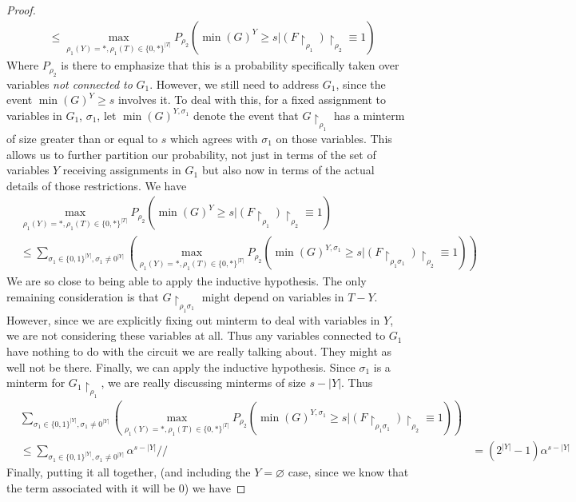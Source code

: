 \documentclass{article}
\theoremstyle{definition}
\theoremstyle{plain}
\theoremstyle{theorem}
\begin{document}
\begin{proof}
\begin{align*}
	 &\leq \max_{\rho_1(Y) = *, \rho_1(T) \in \{0,*\}^{|T|}} P_{\rho_2}(\min(G)^Y \geq s| (F \restriction_{\rho_1}) \restriction_{\rho_2} \equiv 1) 
\end{align*} 
Where $P_{\rho_2}$ is there to emphasize that this is a probability specifically taken over variables \emph{not connected to } $G_1$. However, we still need to address $G_1$, since the event $\min(G)^Y \geq s$ involves it. To deal with this, for a fixed assignment to variables in $G_1$, $\sigma_1$, let $\min(G)^{Y,\sigma_1}$ denote the event that $G \restriction_{\rho_1}$ has a minterm of size greater than or equal to $s$ which agrees with $\sigma_1$ on those variables. This allows us to further partition our probability, not just in terms of the set of variables $Y$ receiving assignments in $G_1$ but also now in terms of the actual details of those restrictions. We have
\begin{align*}
	& \max_{\rho_1(Y) = *, \rho_1(T) \in \{0,*\}^{|T|}} P_{\rho_2}(\min(G)^Y \geq s| (F \restriction_{\rho_1}) \restriction_{\rho_2} \equiv 1) \\
	&\leq \sum_{\sigma_1 \in \{0,1\}^{|Y|},\sigma_1 \neq 0^{|Y|}} \left( \max_{\rho_1(Y) = *, \rho_1(T) \in \{0,*\}^{|T|}} P_{\rho_2}(\min(G)^{Y,\sigma_1} \geq s| (F \restriction_{\rho_1 \sigma_1}) \restriction_{\rho_2} \equiv 1) \right)
\end{align*}
We are so close to being able to apply the inductive hypothesis. The only remaining consideration is that $G \restriction_{\rho_1 \sigma_1}$ might depend on variables in $T-Y$. However, since we are explicitly fixing out minterm to deal with variables in $Y$, we are not considering these variables at all. Thus any variables connected to $G_1$ have nothing to do with the circuit we are really talking about. They might as well not be there. Finally, we can apply the inductive hypothesis. Since $\sigma_1$ is a minterm for $G_1 \restriction_{\rho_1}$, we are really discussing minterms of size $s-|Y|$. Thus 
\begin{align*}
	& \sum_{\sigma_1 \in \{0,1\}^{|Y|},\sigma_1 \neq 0^{|Y|}} \left( \max_{\rho_1(Y) = *, \rho_1(T) \in \{0,*\}^{|T|}} P_{\rho_2}(\min(G)^{Y,\sigma_1} \geq s| (F \restriction_{\rho_1 \sigma_1}) \restriction_{\rho_2} \equiv 1) \right) \\
	&\leq \sum_{\sigma_1 \in \{0,1\}^{|Y|},\sigma_1 \neq 0^{|Y|}} \alpha^{s-|Y|} //
	&= (2^{|Y|}-1)\alpha^{s-|Y|}
\end{align*}
Finally, putting it all together, (and including the $Y=\varnothing$ case, since we know that the term associated with it will be $0$) we have

\end{proof}
\end{document}

